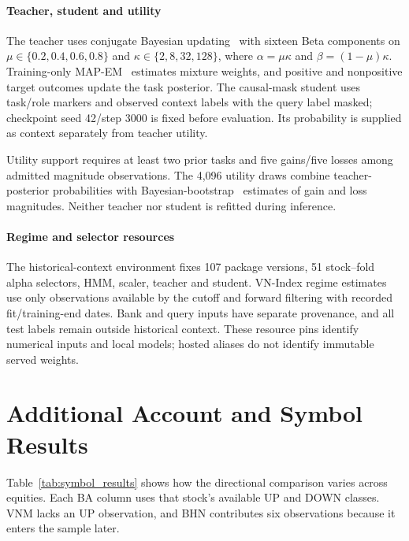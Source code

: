 \paragraph{Teacher, student and utility}
The teacher uses conjugate Bayesian updating~\cite{gelman2013bayesian} with sixteen Beta components on $\mu\in\{0.2,0.4,0.6,0.8\}$ and $\kappa\in\{2,8,32,128\}$, where $\alpha=\mu\kappa$ and $\beta=(1-\mu)\kappa$. Training-only MAP-EM~\cite{dempster1977em} estimates mixture weights, and positive and nonpositive target outcomes update the task posterior. The causal-mask student uses task/role markers and observed context labels with the query label masked; checkpoint seed 42/step 3000 is fixed before evaluation. Its probability is supplied as context separately from teacher utility.

Utility support requires at least two prior tasks and five gains/five losses among admitted magnitude observations. The 4,096 utility draws combine teacher-posterior probabilities with Bayesian-bootstrap~\cite{rubin1981bootstrap} estimates of gain and loss magnitudes. Neither teacher nor student is refitted during inference.

\paragraph{Regime and selector resources}
The historical-context environment fixes 107 package versions, 51 stock--fold alpha selectors, HMM, scaler, teacher and student. VN-Index regime estimates use only observations available by the cutoff and forward filtering with recorded fit/training-end dates. Bank and query inputs have separate provenance, and all test labels remain outside historical context. These resource pins identify numerical inputs and local models; hosted aliases do not identify immutable served weights.

\setcounter{table}{0}
\section{Additional Account and Symbol Results}
\label{app:additional}
Table~\ref{tab:symbol_results} shows how the directional comparison varies
across equities. Each BA column uses that stock's available UP and DOWN
classes. VNM lacks an UP observation, and BHN contributes six observations
because it enters the sample later.



